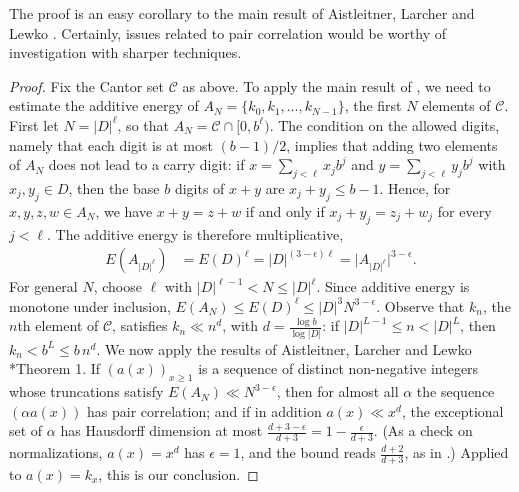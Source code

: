 The proof is an easy corollary to the main result of Aistleitner, Larcher and Lewko \cite{MR3736514}. 
Certainly, issues related to pair correlation would be worthy of investigation with sharper techniques. 


\begin{proof}
Fix the Cantor set $\mathcal C$ as above. To apply the main result of \cite{MR3736514}, we need to estimate the additive energy of 
$A_N=\{k_0,k_1,\ldots,k_{N-1}\}$, the first $N$ elements of $\mathcal C$.  
First let $N=\lvert D\rvert^\ell$, so that $A_N=\mathcal C\cap[0,b^\ell)$. 
The condition on the allowed digits, namely that each digit is at most $(b-1)/2$, implies that adding two elements of $A_N$ does not lead to a carry digit: 
if $x=\sum_{j<\ell}x_jb^j$ and $y=\sum_{j<\ell}y_jb^j$ with $x_j,y_j\in D$, then the base $b$ digits of $x+y$ are $x_j+y_j\leq b-1$. 
Hence, for $x,y,z,w\in A_N$, we have $x+y=z+w$ if and only if $x_j+y_j=z_j+w_j$ for every $j<\ell$. 
The additive energy is therefore multiplicative, 
\begin{align}
    E(A_{\lvert D\rvert^\ell}) &= E(D) ^{\ell} 
     =  \lvert D\rvert ^{(3-\epsilon)\ell} = 
    \lvert A_{\lvert D\rvert^\ell} \rvert ^{3 - \epsilon}. 
\end{align}
For general $N$, choose $\ell$ with $\lvert D\rvert^{\ell-1}<N\leq \lvert D\rvert^\ell$. Since additive energy is monotone under inclusion, 
$E(A_N)\leq E(D)^\ell \leq \lvert D\rvert^{3}N^{3-\epsilon}$.
Observe that  $k_n$, the $n$th element of $\mathcal C$, 
satisfies $k_n \ll n ^d$, with $d= \frac{\log b}{\log \lvert D\rvert}$: if $\lvert D\rvert^{L-1}\leq n<\lvert D\rvert^L$, then $k_n<b^L\leq b\,n^d$. 
We now apply the results of Aistleitner, Larcher and Lewko \cite{MR3736514}*{Theorem 1}. 
If $(a(x))_{x\geq1}$ is a sequence of distinct non-negative integers whose truncations satisfy $E(A_N)\ll N^{3-\epsilon}$, 
then for almost all $\alpha$ the sequence $(\alpha a(x))$ has pair correlation; and if in addition $a(x)\ll x^d$, 
the exceptional set of $\alpha$ has Hausdorff dimension at most $\frac{d+3-\epsilon}{d+3}=1-\frac{\epsilon}{d+3}$. 
(As a check on normalizations, $a(x)=x^d$ has $\epsilon=1$, and the bound reads $\frac{d+2}{d+3}$, as in \cite{MR3736514}.) 
Applied to $a(x)=k_x$, this is our conclusion. 

    
\end{proof}

 